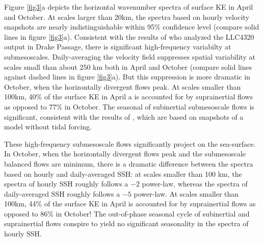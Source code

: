 \documentclass[grl]{agutex2015}
\begin{document}
\begin{article}
Figure \ref{fig3}a depicts the horizontal wavenumber spectra of surface KE in
April and October. At scales larger than 20km, the spectra based on hourly
velocity snapshots are nearly indistinguishable within 95$\%$ confidence level
(compare solid lines in figure \ref{fig3}a). Consistent with the results of
\citet{rocha_etal2016} who analyzed the LLC4320 output in Drake Passage,
there is significant high-frequency variabilty at submesoscales. Daily-averaging
the velocity field suppresses spatial variability at scales small than about 250
km both in April and October (compare solid lines against dashed lines in figure
\ref{fig3}a). But this suppression is more dramatic in October, when the horizontally
divergent flows peak. At scales
smaller than 100km, 40$\%$ of the surface KE in April a is accounted for by suprainertial
flows as opposed to 77$\%$ in October. The seasonal of subinertial submesoscale flows
is significant, consistent with the results of \citet{sasaki_etal2014}, which are
based on snapshots of a model without tidal forcing.

These high-frequency submesoscale flows significantly project on the sea-surface.
In October, when the horizontally divergent flows peak and the submesoscale
balanced flows are minimum, there is a dramatic difference between the spectra
based on hourly and daily-averaged SSH: at scales smaller than 100 km, the spectra
of hourly SSH roughly follows a $-2$ power-law, whereas the spectra of daily-averaged
SSH roughly follows a $-5$ power-law. At scales
smaller than 100km, 44$\%$ of the surface KE in April is accounted for by suprainertial
flows as opposed to 86$\%$ in October! The out-of-phase seasonal cycle of subinertial
and suprainertial flows conspire to yield no significant seasonality in the spectra
of hourly SSH.

%
%
%





\end{article}
\end{document}
